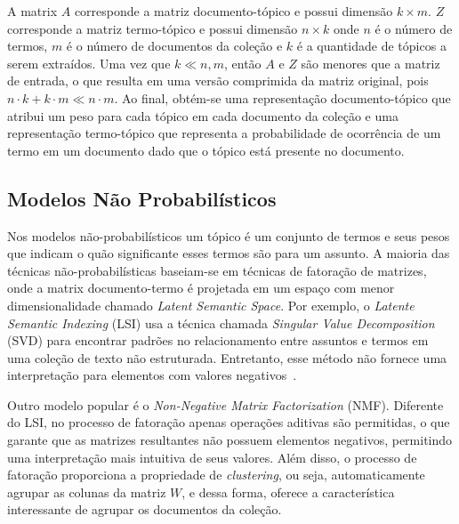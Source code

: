 A matrix
$A$ corresponde a matriz documento-tópico e possui dimensão $k \times m$. $Z$ corresponde a matriz termo-tópico e possui dimensão $n \times k$ onde $n$ é o número de termos, $m$ é o número de documentos da coleção e $k$ é a quantidade de tópicos a serem extraídos.
Uma vez que $k \ll n,m$, então $A$ e $Z$ são menores que a matriz de entrada, o que resulta em uma versão comprimida da matriz original, pois $n \cdot k + k \cdot m \ll n \cdot m$.
% 
% 
Ao final, obtém-se uma representação documento-tópico que atribui um peso para cada tópico em cada documento da coleção e uma representação termo-tópico que representa a probabilidade de ocorrência de um termo em um documento dado que o tópico está presente no documento.


\subsection{Modelos Não Probabilísticos}

Nos modelos não-probabilísticos um tópico é um conjunto de termos e seus pesos que indicam o quão significante esses termos são para um assunto. A maioria das técnicas não-probabilísticas baseiam-se em técnicas de fatoração de matrizes, onde a matrix documento-termo é projetada em um espaço com menor dimensionalidade chamado \textit{Latent Semantic Space}. Por exemplo, o \textit{Latente Semantic Indexing} (LSI) usa a técnica chamada \textit{Singular Value Decomposition} (SVD) para encontrar padrões no relacionamento entre assuntos e termos em uma coleção de texto não estruturada. Entretanto, esse método não fornece uma interpretação para elementos com valores negativos~\cite{Cheng2013}. %

Outro modelo popular é o \textit{Non-Negative Matrix Factorization} (NMF).  Diferente do LSI, no processo de fatoração apenas operações aditivas são permitidas, o que garante que as matrizes resultantes não possuem elementos negativos, permitindo uma interpretação mais intuitiva de seus valores. Além disso, o processo de fatoração proporciona a propriedade de \textit{clustering}, ou seja, automaticamente agrupar as colunas da matriz $W$, e dessa forma, oferece a característica interessante de agrupar os documentos da coleção. 

